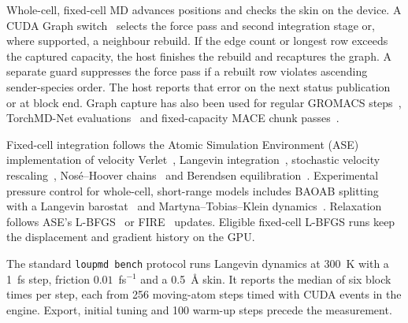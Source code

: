 Whole-cell, fixed-cell MD advances positions and checks the skin on the device. A CUDA Graph switch~\cite{nvidia2026cudagraphs} selects the force pass and second integration stage or, where supported, a neighbour rebuild. If the edge count or longest row exceeds the captured capacity, the host finishes the rebuild and recaptures the graph. A separate guard suppresses the force pass if a rebuilt row violates ascending sender-species order. The host reports that error on the next status publication or at block end. Graph capture has also been used for regular GROMACS steps~\cite{gray2023gromacsgraphs}, TorchMD-Net evaluations~\cite{pelaez2024torchmdnet} and fixed-capacity MACE chunk passes~\cite[\S 3.6]{liu2026foundation}.

Fixed-cell integration follows the Atomic Simulation Environment (ASE) implementation of velocity Verlet~\cite{larsen2017ase}, Langevin integration~\cite{vandeneijnden2006langevin}, stochastic velocity rescaling~\cite{bussi2007csvr}, Nos\'e--Hoover chains~\cite{martyna1992nhc} and Berendsen equilibration~\cite{berendsen1984bath}. Experimental pressure control for whole-cell, short-range models includes BAOAB splitting~\cite{leimkuhler2013baoab} with a Langevin barostat~\cite{quigley2004langevin} and Martyna--Tobias--Klein dynamics~\cite{martyna1994mtk,tuckerman2006liouville}. Relaxation follows ASE's L-BFGS~\cite{larsen2017ase,liu1989lbfgs} or FIRE~\cite{bitzek2006fire} updates. Eligible fixed-cell L-BFGS runs keep the displacement and gradient history on the GPU.

The standard \texttt{loupmd bench} protocol runs Langevin dynamics at 300~K with a 1~fs step, friction $0.01$~fs$^{-1}$ and a 0.5~\AA{} skin. It reports the median of six block times per step, each from 256 moving-atom steps timed with CUDA events in the engine. Export, initial tuning and 100 warm-up steps precede the measurement.

